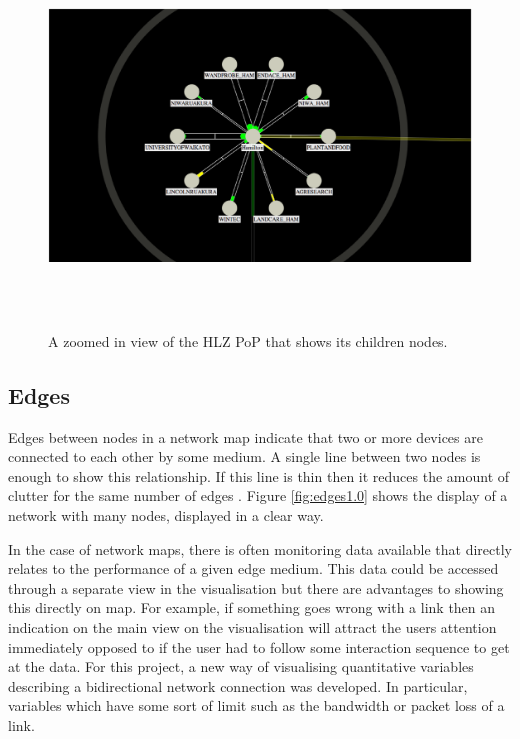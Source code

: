 \documentclass[11pt, a4paper]{article}
\begin{document}
\begin{figure}
\centering
\includegraphics[width=170mm,height=101.93mm]{assets/nodes1-1.eps}
\caption{A zoomed in view of the HLZ PoP that shows its children nodes.}
\label{fig:nodes1.1}
\end{figure}

\subsection{Edges}
\label{sec:edges.vis}

Edges between nodes in a network map indicate that two or more devices are
connected to each other by some medium. A single line between two nodes is
enough to show this relationship. If this line is thin then it reduces the
amount of clutter for the same number of edges \cite{Tufte_2007}. Figure
\ref{fig:edges1.0} shows the display of a network with many nodes, displayed in
a clear way.

In the case of network maps, there is often monitoring data available that
directly relates to the performance of a given edge medium. This data could be
accessed through a separate view in the visualisation but there are advantages
to showing this directly on map. For example, if something goes wrong with a
link then an indication on the main view on the visualisation will attract the
users attention immediately opposed to if the user had to follow some
interaction sequence to get at the data. For this project, a new way of
visualising quantitative variables describing a bidirectional network connection
was developed. In particular, variables which have some sort of limit such as
the bandwidth or packet loss of a link.
\end{document}

